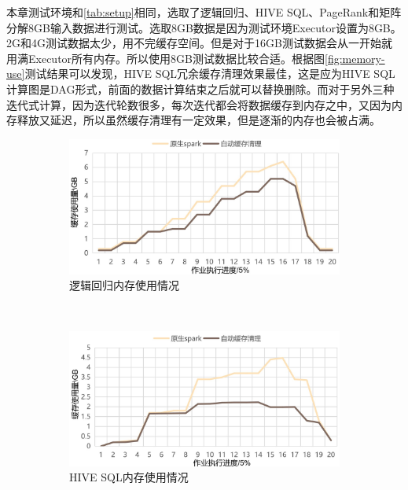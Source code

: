 本章测试环境和\ref{tab:setup}相同，选取了逻辑回归、HIVE SQL、PageRank和矩阵分解8GB输入数据进行测试。选取8GB数据是因为测试环境Executor设置为8GB。2G和4G测试数据太少，用不完缓存空间。但是对于16GB测试数据会从一开始就用满Executor所有内存。所以使用8GB测试数据比较合适。根据图\ref{fig:memory-use}测试结果可以发现，HIVE SQL冗余缓存清理效果最佳，这是应为HIVE SQL计算图是DAG形式，前面的数据计算结束之后就可以替换删除。而对于另外三种迭代式计算，因为迭代轮数很多，每次迭代都会将数据缓存到内存之中，又因为内存释放又延迟，所以虽然缓存清理有一定效果，但是逐渐的内存也会被占满。

\begin{figure}
    \centering
    \begin{subfigure}[b]{0.45\linewidth}
      \includegraphics[width=\textwidth]{Img/lr3.jpg}
      \caption{逻辑回归内存使用情况}
      \label{fig:lr-use}
    \end{subfigure}%
    ~%
    \begin{subfigure}[b]{0.45\linewidth}
      \includegraphics[width=\textwidth]{Img/hive3.jpg}
      \caption{HIVE SQL内存使用情况}
      \label{fig:hive-use}
    \end{subfigure}
    \\%
    \begin{subfigure}[b]{0.45\linewidth}

\end{subfigure}
\end{figure}
